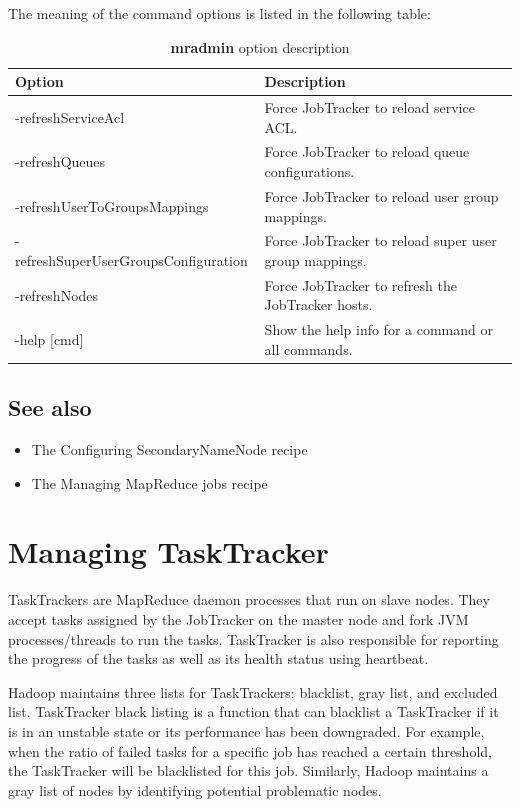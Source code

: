 The meaning of the command options is listed in the following table:
\begin{table}
  \centering
  \begin{tabular}{ll}
    \toprule 
    \textbf{Option} & \textbf{Description} \\  \midrule
    -refreshServiceAcl & Force JobTracker to reload service ACL. \\
    -refreshQueues & Force JobTracker to reload queue configurations. \\
    -refreshUserToGroupsMappings & Force JobTracker to reload user group mappings. \\
    -refreshSuperUserGroupsConfiguration & Force JobTracker to reload super user group mappings. \\
    -refreshNodes & Force JobTracker to refresh the JobTracker hosts. \\
    -help [cmd] & Show the help info for a command or all commands. \\ \bottomrule
  \end{tabular} 
  \caption{\textbf{mradmin} option description}\label{tbl:mradmin}
\end{table}

\subsection*{See also}
\begin{itemize}
\item The Configuring SecondaryNameNode recipe
\item The Managing MapReduce jobs recipe
\end{itemize} 

\section{Managing TaskTracker}
TaskTrackers are MapReduce daemon processes that run on slave nodes. They accept tasks assigned by the JobTracker on the master node and fork JVM processes/threads to run the tasks. TaskTracker is also responsible for reporting the progress of the tasks as well as its health status using heartbeat.

Hadoop maintains three lists for TaskTrackers: blacklist, gray list, and excluded list. TaskTracker black listing is a function that can blacklist a TaskTracker if it is in an unstable state or its performance has been downgraded. For example, when the ratio of failed tasks for a specific job has reached a certain threshold, the TaskTracker will be blacklisted for this job. Similarly, Hadoop maintains a gray list of nodes by identifying potential problematic nodes.

